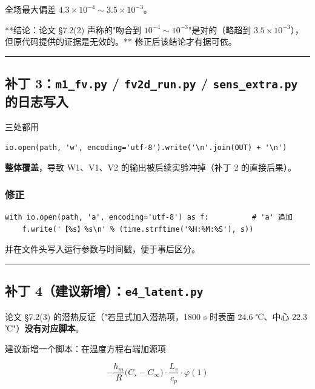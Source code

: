 全场最大偏差 $4.3\times10^{-4}\sim3.5\times10^{-3}$。


**结论：论文 §7.2(2) 声称的"吻合到 $10^{-4}\sim10^{-3}$"是对的（略超到 $3.5\times10^{-3}$），但原代码提供的证据是无效的。** 修正后该结论才有据可依。


\vspace{1mm}\hrule\vspace{1mm}


\subsection{补丁 3：\texttt{m1\_fv.py} / \texttt{fv2d\_run.py} / \texttt{sens\_extra.py} 的日志写入}


三处都用


\begin{lstlisting}
io.open(path, 'w', encoding='utf-8').write('\n'.join(OUT) + '\n')
\end{lstlisting}


\textbf{整体覆盖}，导致 W1、V1、V2 的输出被后续实验冲掉（补丁 2 的直接后果）。


\subsubsection{修正}


\begin{lstlisting}
with io.open(path, 'a', encoding='utf-8') as f:          # 'a' 追加
    f.write('【%s】%s\n' % (time.strftime('%H:%M:%S'), s))
\end{lstlisting}


并在文件头写入运行参数与时间戳，便于事后区分。


\vspace{1mm}\hrule\vspace{1mm}


\subsection{补丁 4（建议新增）：\texttt{e4\_latent.py}}


论文 §7.2(3) 的潜热反证（"若显式加入潜热项，1800 s 时表面 24.6 ℃、中心 22.3 ℃"）\textbf{没有对应脚本}。

建议新增一个脚本：在温度方程右端加源项


\begin{equation*}
-\frac{h_m}{R}\big(C_s-C_\infty\big)\cdot\frac{L_v}{c_p}\cdot\varphi(1)
\end{equation*}


